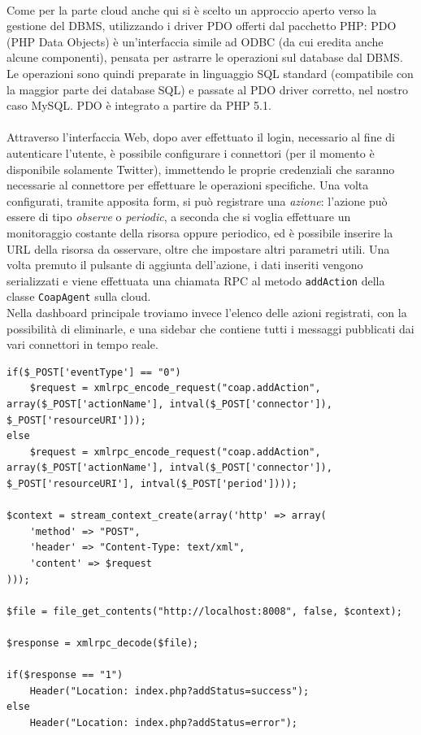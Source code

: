 \\Come per la parte cloud anche qui si è scelto un approccio aperto verso la gestione del DBMS, utilizzando i driver PDO offerti dal pacchetto PHP: PDO (PHP Data Objects) è un'interfaccia simile ad ODBC (da cui eredita anche alcune componenti), pensata per astrarre le operazioni sul database dal DBMS. Le operazioni sono quindi preparate in linguaggio SQL standard (compatibile con la maggior parte dei database SQL) e passate al PDO driver corretto, nel nostro caso MySQL. PDO è integrato a partire da PHP 5.1.
\\\\Attraverso l'interfaccia Web, dopo aver effettuato il login, necessario al fine di autenticare l'utente, è possibile configurare i connettori (per il momento è disponibile solamente Twitter), immettendo le proprie credenziali che saranno necessarie al connettore per effettuare le operazioni specifiche. Una volta configurati, tramite apposita form, si può registrare una \textit{azione}: l'azione può essere di tipo \textit{observe} o \textit{periodic}, a seconda che si voglia effettuare un monitoraggio costante della risorsa oppure periodico, ed è possibile inserire la URL della risorsa da osservare, oltre che impostare altri parametri utili. Una volta premuto il pulsante di aggiunta dell'azione, i dati inseriti vengono serializzati e viene effettuata una chiamata RPC al metodo {\tt addAction} della classe {\tt CoapAgent} sulla cloud.
\\Nella dashboard principale troviamo invece l'elenco delle azioni registrati, con la possibilità di eliminarle, e una sidebar che contiene tutti i messaggi pubblicati dai vari connettori in tempo reale.

\lstset{title=Il codice PHP che serializza la chiamata RPC su XML e la deserializza per leggere il valore di ritorno, language=PHP}
\begin{lstlisting}[float]
if($_POST['eventType'] == "0")
	$request = xmlrpc_encode_request("coap.addAction", array($_POST['actionName'], intval($_POST['connector']), $_POST['resourceURI']));
else
	$request = xmlrpc_encode_request("coap.addAction", array($_POST['actionName'], intval($_POST['connector']), $_POST['resourceURI'], intval($_POST['period'])));
	
$context = stream_context_create(array('http' => array(
    'method' => "POST",
    'header' => "Content-Type: text/xml",
    'content' => $request
)));

$file = file_get_contents("http://localhost:8008", false, $context);

$response = xmlrpc_decode($file);

if($response == "1")
	Header("Location: index.php?addStatus=success");
else
	Header("Location: index.php?addStatus=error");
\end{lstlisting}

